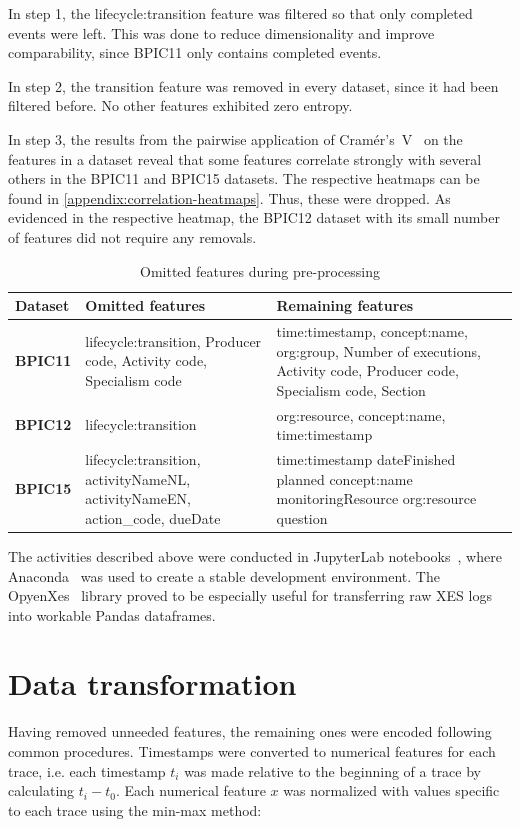 In step 1, the lifecycle:transition feature was filtered so that only completed events were left. This was done to reduce dimensionality and improve comparability, since BPIC11 only contains completed events.

In step 2, the transition feature was removed in every dataset, since it had been filtered before. No other features exhibited zero entropy.

In step 3, the results from the pairwise application of Cramér's~V~\cite{bergsma2013bias} on the features in a dataset reveal that some features correlate strongly with several others in the BPIC11 and BPIC15 datasets. The respective heatmaps can be found in \autoref{appendix:correlation-heatmaps}. Thus, these were dropped. As evidenced in the respective heatmap, the BPIC12 dataset with its small number of features did not require any removals.

\begin{table}
\centering
\begin{tabular}{lp{6cm}p{6cm}}
\textbf{Dataset} & \textbf{Omitted features} & \textbf{Remaining features}\\
\hline
\textbf{BPIC11} & lifecycle:transition, Producer code, Activity code, Specialism code & time:timestamp, concept:name, org:group, Number of executions, Activity code, Producer code, Specialism code, Section\\
\textbf{BPIC12} & lifecycle:transition & org:resource, concept:name, time:timestamp\\
\textbf{BPIC15} & lifecycle:transition, activityNameNL, activityNameEN, action\_code, dueDate & time:timestamp 	dateFinished 	planned 	concept:name 	monitoringResource 	org:resource 	question
\end{tabular}
\caption{Omitted features during pre-processing}
\label{tab:dataset-preprocessing}
\end{table}

The activities described above were conducted in JupyterLab notebooks~\cite{web:jupyter}, where Anaconda~\cite{web:anaconda} was used to create a stable development environment. The OpyenXes~\cite{web:opyenxes} library proved to be especially useful for transferring raw XES logs into workable Pandas dataframes.

\section{Data transformation}
\label{sec:eval:data-transformation}
Having removed unneeded features, the remaining ones were encoded following common procedures. Timestamps were converted to numerical features for each trace, i.e. each timestamp $t_i$ was made relative to the beginning of a trace by calculating $t_i - t_0$. Each numerical feature $x$ was normalized with values specific to each trace using the min-max method:

